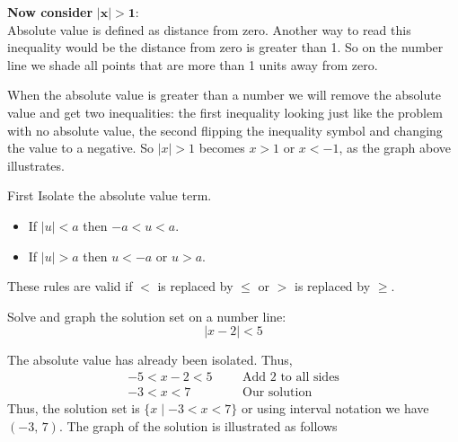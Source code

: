 \vspace{0.2cm}
\textbf{Now consider} $\bm{|x| >1}$: \\
Absolute value is defined as distance from zero. Another way to read this inequality would be the distance from zero is greater than 1. So on the number line we shade all points that are more than 1 units away from zero.
    \begin{center}
    \end{center}
When the absolute value is greater than a number we will remove the absolute value and get two inequalities: the first inequality looking just like the problem with no absolute value, the second flipping the inequality symbol and changing the value to a negative. So $|x| > 1$ becomes $x > 1$ or $x < − 1$, as the graph
above illustrates.
\begin{tcolorbox}[title=How to solve an absolute value inequalities,
colback=blue!5!white,
colframe=blue!75!black,
fonttitle=\bfseries]
First Isolate the absolute value term.
    \begin{itemize}
        \item If $|u|< a$ then $-a< u <a$.
        \item If $|u|>a$ then $u<-a$ or $u>a$.
    \end{itemize}
These rules are valid if $<$ is replaced by $\le$ or $>$ is replaced by $\ge$. 
\end{tcolorbox}
\begin{exa}
    Solve and graph the solution set on a number line:
    \begin{equation*}
            |x-2|<5
    \end{equation*}
\end{exa}
The absolute value has already been isolated. Thus,
\begin{align*}
    -5<x-2<5&  &&\text{Add 2 to all sides}\\
    -3<x<7&  &&\text{Our solution}
\end{align*}
Thus, the solution set is $\{ x \mid -3<x<7\}$ or using interval notation we have $(-3,\,7)$. The graph of the solution is illustrated as follows
